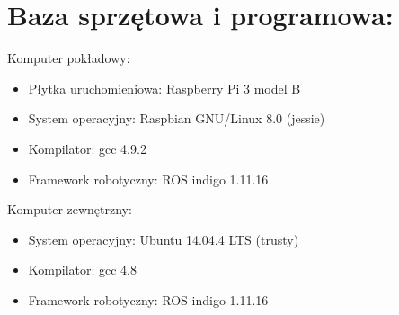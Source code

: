 \documentclass[a4paper]{article}
\begin{document}
\section{ Baza sprzętowa i programowa:}
Komputer pokładowy:
\begin{itemize}
\item Płytka uruchomieniowa: Raspberry Pi 3 model B
\item System operacyjny:     Raspbian GNU/Linux 8.0 (jessie)
\item Kompilator:            gcc 4.9.2
\item Framework robotyczny:  ROS indigo 1.11.16
\end{itemize}

Komputer zewnętrzny:
\begin{itemize}
\item System operacyjny:     Ubuntu 14.04.4 LTS (trusty)
\item Kompilator:            gcc 4.8
\item Framework robotyczny:  ROS indigo 1.11.16
\end{itemize}
\end{document}
